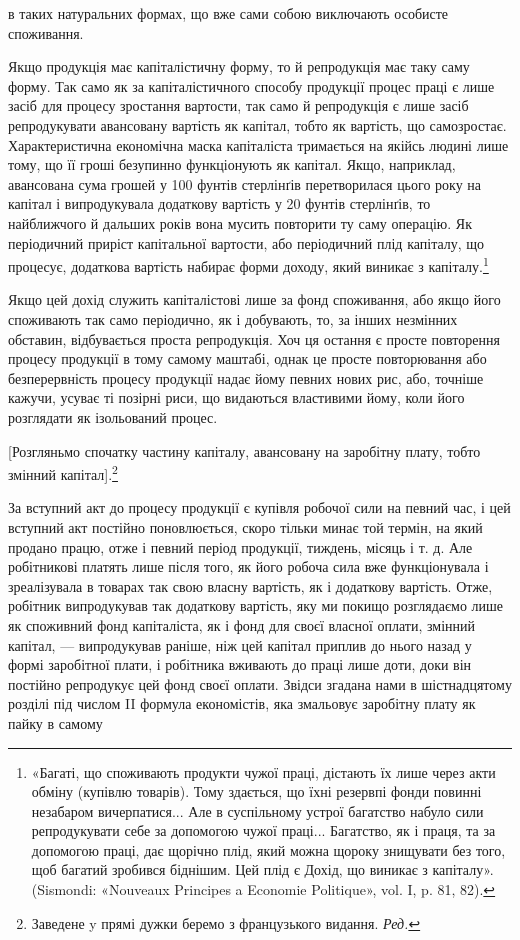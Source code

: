 \parcont{}  %
в таких натуральних формах, що вже сами собою виключають
особисте споживання.

Якщо продукція має капіталістичну форму, то й репродукція
має таку саму форму. Так само як за капіталістичного способу
продукції процес праці є лише засіб для процесу зростання
вартости, так само й репродукція є лише засіб репродукувати
авансовану вартість як капітал, тобто як вартість, що самозростає.
Характеристична економічна маска капіталіста тримається
на якійсь людині лише тому, що її гроші безупинно функціонують
як капітал. Якщо, наприклад, авансована сума грошей
у 100 фунтів стерлінґів перетворилася цього року на капітал
і випродукувала додаткову вартість у 20 фунтів стерлінґів,
то найближчого й дальших років вона мусить повторити ту саму
операцію. Як періодичний приріст капітальної вартости, або
періодичний плід капіталу, що процесує, додаткова вартість набирає
форми доходу, який виникає з капіталу.\footnote{
«Багаті, що споживають продукти чужої праці, дістають їх лише
через акти обміну (купівлю товарів). Тому здається, що їхні резервпі
фонди повинні незабаром вичерпатися... Але в суспільному устрої багатство
набуло сили репродукувати себе за допомогою чужої праці... Багатство,
як і праця, та за допомогою праці, дає щорічно плід, який можна
щороку знищувати без того, щоб багатий зробився біднішим. Цей плід є
Дохід, що виникає з капіталу». (Sismondi: «Nouveaux Principes a Economie
Politique», vol. I, p. 81, 82).
}

Якщо цей дохід служить капіталістові лише за фонд споживання,
або якщо його споживають так само періодично, як і
добувають, то, за інших незмінних обставин, відбувається проста
репродукція. Хоч ця остання є просте повторення процесу продукції
в тому самому маштабі, однак це просте повторювання або
безперервність процесу продукції надає йому певних нових рис,
або, точніше кажучи, усуває ті позірні риси, що видаються властивими
йому, коли його розглядати як ізольований процес.

[Розгляньмо спочатку частину капіталу, авансовану на заробітну
плату, тобто змінний капітал].\footnote*{
Заведене y прямі дужки беремо з французького видання. \emph{Ред.}
}

За вступний акт до процесу продукції є купівля робочої сили
на певний час, і цей вступний акт постійно поновлюється, скоро
тільки минає той термін, на який продано працю, отже і певний
період продукції, тиждень, місяць і т. д. Але робітникові платять
лише після того, як його робоча сила вже функціонувала і зреалізувала
в товарах так свою власну вартість, як і додаткову вартість.
Отже, робітник випродукував так додаткову вартість, яку
ми покищо розглядаємо лише як споживний фонд капіталіста,
як і фонд для своєї власної оплати, змінний капітал, — випродукував
раніше, ніж цей капітал приплив до нього назад у формі
заробітної плати, і робітника вживають до праці лише доти,
доки він постійно репродукує цей фонд своєї оплати. Звідси
згадана нами в шістнадцятому розділі під числом II формула
економістів, яка змальовує заробітну плату як пайку в самому
\parbreak{}  %
